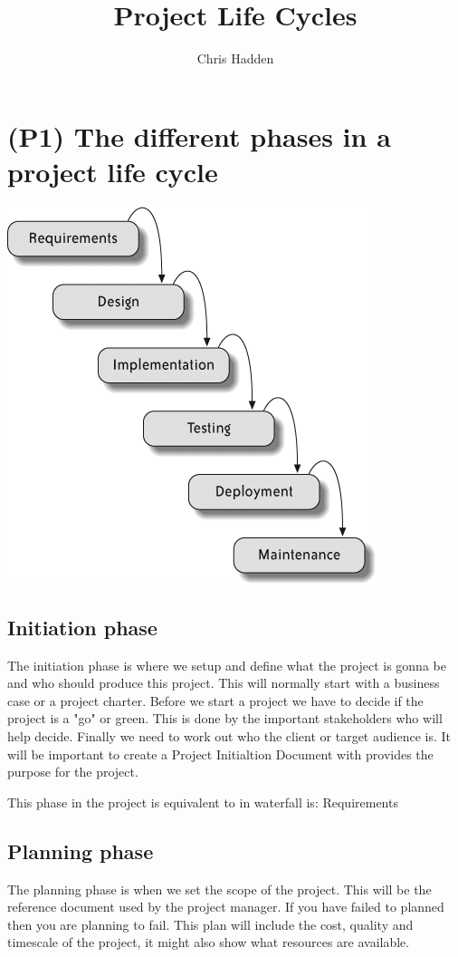 \documentclass{article}
\title{Project Life Cycles}
\author{Chris Hadden}
\begin{document}
\maketitle

\tableofcontents

\section{(P1) The different phases in a project life cycle}
\includegraphics[scale=0.5]{Modern-Waterfall-Diagram}
\cite{modernwaterfall}
\subsection{Initiation phase}
The initiation phase is where we setup and define what the project is gonna be and who should produce this project. This will normally start with a business case or a project charter.
Before we start a project we have to decide if the project is a "go" or green. This is done by the important stakeholders who will help decide.
Finally we need to work out who the client or target audience is.
It will be important to create a Project Initialtion Document with provides the purpose for the project.\cite{kiss}

This phase in the project is equivalent to in waterfall is: Requirements

\subsection{Planning phase}
The planning phase is when we set the scope of the project. This will be the reference document used by the project manager.
If you have failed to planned then you are planning to fail.
This plan will include the cost, quality and timescale of the project, it might also show what resources are available.
\end{document}
